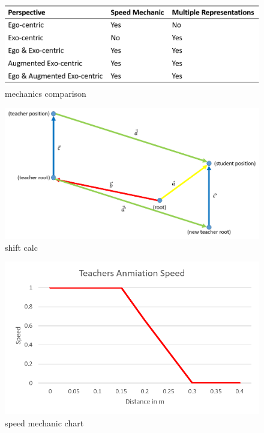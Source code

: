 \begin{figure}[htb]
	\centering
	\includegraphics[width=\textwidth]{figures/mechanics_comparison.png}
	\caption[mechanics comparison]{mechanics comparison}
	\label{fig:mechanics_comparison}
\end{figure}

\begin{figure}[htb]
	\centering
	\includegraphics[width=\textwidth]{figures/shift_calc.png}
	\caption[shift calc]{shift calc}
	\label{fig:shift_calc}
\end{figure}

\begin{figure}[htb]
	\centering
	\includegraphics[width=\textwidth]{figures/speed_mechanic_chart.png}
	\caption[speed mechanic chart]{speed mechanic chart}
	\label{fig:speed_mechanic_chart}
\end{figure}

